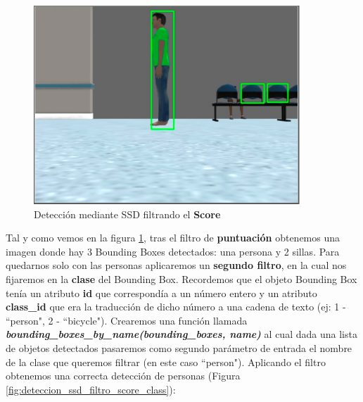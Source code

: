 \begin{figure} [H]
  \begin{center}
    \includegraphics[width=10cm]{imagenes/deteccion-ssd-filtro-score.png}
  \end{center}
  \caption[Detección mediante SSD filtrando el \textbf{Score}]{Detección mediante SSD filtrando el \textbf{Score}}
  \label{fig:deteccion_ssd_filtro_score}
\end{figure}

Tal y como vemos en la figura \ref{fig:deteccion_ssd_filtro_score}, tras el filtro de \textbf{puntuación} obtenemos una imagen donde hay 3 Bounding Boxes detectados: una persona y 2 sillas. Para quedarnos solo con las personas aplicaremos un \textbf{segundo filtro}, en la cual nos fijaremos en la \textbf{clase} del Bounding Box. Recordemos que el objeto Bounding Box tenía un atributo \textbf{id} que correspondía a un número entero y un atributo \textbf{class\_id} que era la traducción de dicho número a una cadena de texto (ej: 1 - ``person", 2 - ``bicycle"). Crearemos una función llamada \textbf{\textit{bounding\_boxes\_by\_name(bounding\_boxes, name)}} al cual dada una lista de objetos detectados pasaremos como segundo parámetro de entrada el nombre de la clase que queremos filtrar (en este caso ``person"). Aplicando el filtro obtenemos una correcta detección de personas (Figura \ref{fig:deteccion_ssd_filtro_score_class}):

